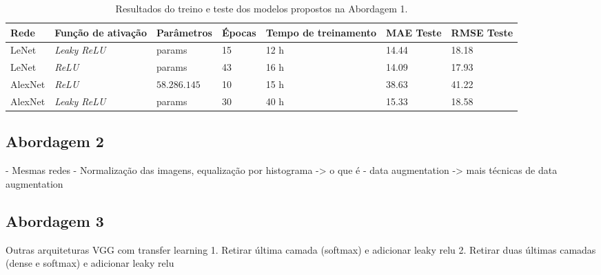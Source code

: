 \begin{table}[!ht]
	\caption{Resultados do treino e teste dos modelos propostos na Abordagem 1.}
	\label{tab:results-2}
	\begin{adjustbox}{width=1\textwidth}
		\begin{tabular}{l l l l l l l}
			\toprule
			Rede & Função de ativação & Parâmetros & Épocas & Tempo de treinamento & MAE Teste & RMSE Teste \\
			\midrule
			LeNet & \emph{Leaky ReLU} & params & 15 & 12 h & 14.44 & 18.18 \\
			LeNet & \emph{ReLU} & params & 43 & 16 h & 14.09 & 17.93 \\
			AlexNet & \emph{ReLU} & $58.286.145$ & 10 & 15 h & 38.63 & 41.22 \\
			AlexNet & \emph{Leaky ReLU} & params & 30 & 40 h & 15.33 & 18.58 \\
			\bottomrule
		\end{tabular}
	\end{adjustbox}
\end{table}

\subsection{Abordagem 2}

- Mesmas redes
- Normalização das imagens, equalização por histograma -> o que é
- data augmentation ->  mais técnicas de data augmentation

\subsection{Abordagem 3}

Outras arquiteturas
VGG
com transfer learning
1. Retirar última camada (softmax) e adicionar leaky relu
2. Retirar duas últimas camadas (dense e softmax) e adicionar leaky relu
